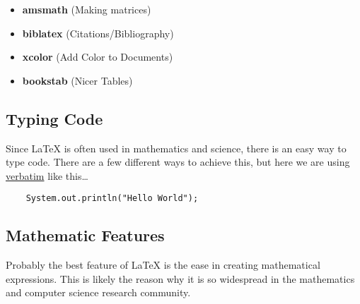 \begin{itemize}
\item \textbf{amsmath} (Making matrices)
\item \textbf{biblatex} (Citations/Bibliography)
\item \textbf{xcolor} (Add Color to Documents)

\item \textbf{bookstab} (Nicer Tables)

\end{itemize}
\subsection{Typing Code}
{Since LaTeX is often used in mathematics and science, there is an easy way to type code. There are a few different ways to achieve this,
but here we are using \underline{verbatim} like this\ldots}
\begin{verbatim}
    System.out.println("Hello World");
\end{verbatim}
\subsection{Mathematic Features}
{Probably the best feature of LaTeX is the ease in creating mathematical expressions. This is likely the reason why it is so widespread
in the mathematics and computer science research community.}
